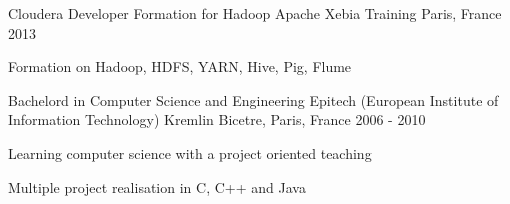 

\begin{cventries}

  \cventry
    {Cloudera Developer Formation for Hadoop Apache} %
    {Xebia Training}
    {Paris, France} %
    {2013} %
    {
      \begin{cvitems} %
        \item {Formation on Hadoop, HDFS, YARN, Hive, Pig, Flume}
      \end{cvitems}
    }
  \cventry
    {Bachelord in Computer Science and Engineering} %
    {Epitech (European Institute of Information Technology)} %
    {Kremlin Bicetre, Paris, France} %
    {2006 - 2010} %
    {
      \begin{cvitems} %
        \item {Learning computer science with a project oriented teaching}
        \item {Multiple project realisation in C, C++ and Java}
      \end{cvitems}
    }

\end{cventries}
